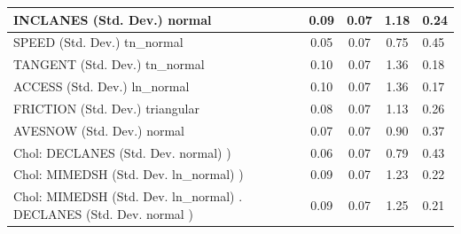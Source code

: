 \begin{table}
\begin{center}
\begin{tabular}{|l|l|c|c|c|l|}
			INCLANES (Std. Dev.) normal &  & 0.09 & 0.07 & 1.18 & 0.24 \\
			\hline
			SPEED (Std. Dev.) tn_normal &  & 0.05 & 0.07 & 0.75 & 0.45 \\
			\hline
			TANGENT (Std. Dev.) tn_normal &  & 0.10 & 0.07 & 1.36 & 0.18 \\
			\hline
			ACCESS (Std. Dev.) ln_normal &  & 0.10 & 0.07 & 1.36 & 0.17 \\
			\hline
			FRICTION (Std. Dev.) triangular &  & 0.08 & 0.07 & 1.13 & 0.26 \\
			\hline
			AVESNOW (Std. Dev.) normal &  & 0.07 & 0.07 & 0.90 & 0.37 \\
			\hline
			 Chol: DECLANES (Std. Dev. normal) ) &  & 0.06 & 0.07 & 0.79 & 0.43 \\
			\hline
			 Chol: MIMEDSH (Std. Dev. ln_normal) ) &  & 0.09 & 0.07 & 1.23 & 0.22 \\
			\hline
			 Chol: MIMEDSH (Std. Dev. ln_normal) . DECLANES (Std. Dev.   normal ) &  & 0.09 & 0.07 & 1.25 & 0.21 \\
			\hline
		\end{tabular}
	\end{center}
\end{table}